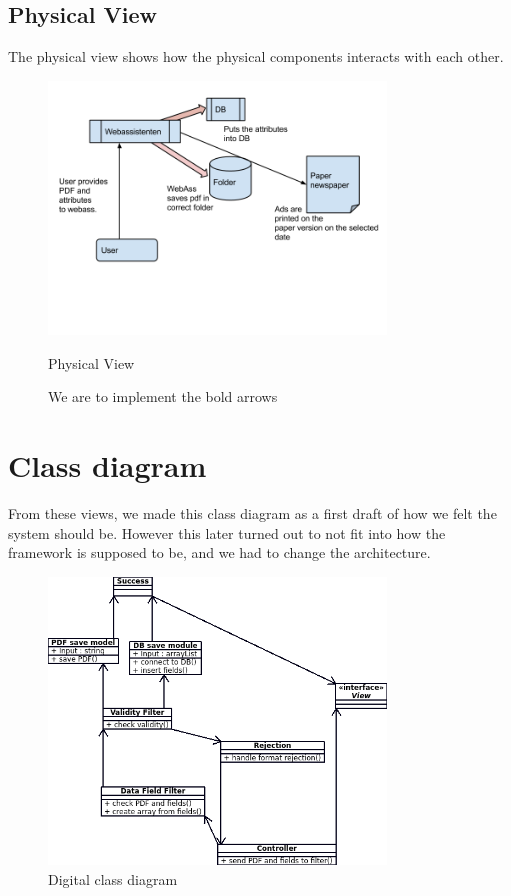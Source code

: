 \subsection{Physical View}
The physical view shows how the physical components interacts with each other.
\begin{figure}[H]
\centering
\includegraphics[width=0.8\textwidth]{images/architecture02.png}
\caption{Physical View}
\caption*{We are to implement the bold arrows}
\label{fig:physical_view}
\end{figure}
\newpage
\section{Class diagram}
From these views, we made this class diagram as a first draft of how we felt the system should be. However this later turned out to not fit into how the framework is supposed to be, and we had to change the architecture.
\begin{figure}[H]
\centering
\includegraphics[width=0.8\textwidth]{diagrams/class_diagram.png}
\caption{Digital class diagram}
\label{fig:class_diagram}
\end{figure}
